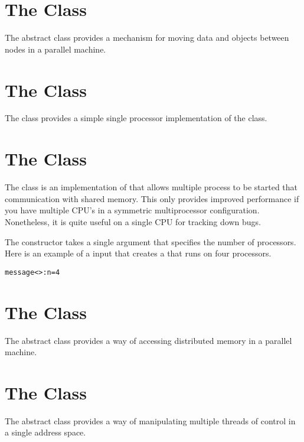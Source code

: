 

\section{The  Class}
\label{MessageGrp}

The  abstract class provides
a mechanism for moving data and objects between
nodes in a parallel machine.


\section{The  Class}
\label{ProcMessageGrp}

The  class provides
a simple single processor implementation of
the  class.


\section{The  Class}
\label{ShmMessageGrp}

The  class is an implementation of
 that allows multiple process to be
started that communication with shared memory.  This
only provides improved performance if you have multiple
CPU's in a symmetric multiprocessor configuration.  Nonetheless,
it is quite useful on a single CPU for tracking down bugs.

The   constructor takes
a single argument that specifies the number of processors.
Here is an example of a  input that
creates a  that runs on four processors.
\begin{alltt}
message<>: n = 4
\end{alltt}


\section{The  Class}
\label{MemoryGrp}

The  abstract class provides a way of accessing
distributed memory in a parallel machine.


\section{The  Class}
\label{ThreadGrp}

The  abstract class provides a way of manipulating
multiple threads of control in a single address space.
